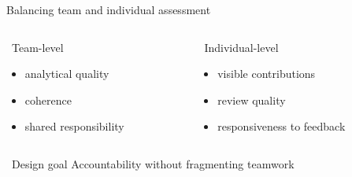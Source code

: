 \documentclass[
    NAME={Dr. Helga Ingimundardóttir},
    EMAIL={helgaingim@hi.is},
    FACULTY={Industrial Engineering},
    TITLE={Using Pull Requests to Make Collaboration Visible in CDIO Project-Based Courses},
    SEMINAR={22\textsuperscript{nd} International CDIO Conference},
    DATE={June 22\textsuperscript{nd} 2026},
    WIDE=true
]{HI-LaTeX/hi-beamer}
\begin{document}
\begin{frame}{Balancing team and individual assessment}
\begin{columns}[T,onlytextwidth]
\begin{column}{.48\textwidth}
\begin{block}{\faUsers~Team-level}
\begin{itemize}
    \item analytical quality
    \item coherence
    \item shared responsibility
\end{itemize}
\end{block}
\end{column}
\begin{column}{.48\textwidth}
\begin{block}{\faUserCheck~Individual-level}
\begin{itemize}
    \item visible contributions
    \item review quality
    \item responsiveness to feedback
\end{itemize}
\end{block}
\end{column}
\end{columns}
\vspace{0.4em}
\begin{alertblock}{\faScaleBalanced~Design goal}
Accountability without fragmenting teamwork
\end{alertblock}
\end{frame}
\end{document}
